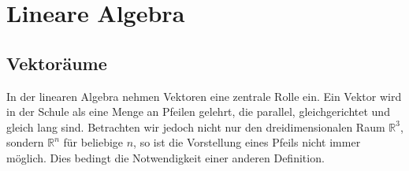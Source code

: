 


%

\section{Lineare Algebra}
\subsection{Vektoräume}
In der linearen Algebra nehmen Vektoren eine zentrale Rolle ein. Ein Vektor wird in der Schule als eine Menge an Pfeilen gelehrt, die parallel, gleichgerichtet und gleich lang sind. Betrachten wir jedoch nicht nur den dreidimensionalen Raum $\mathbb{R}^3$, sondern $\mathbb{R}^n$ f\"ur beliebige $n$, so ist die Vorstellung eines Pfeils nicht immer m\"oglich. Dies bedingt die Notwendigkeit einer anderen Definition.

